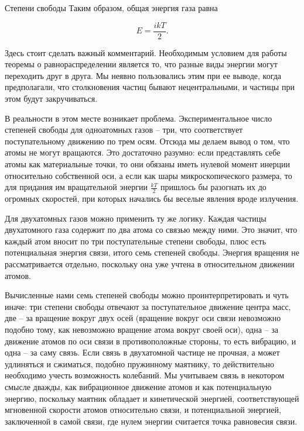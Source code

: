 \documentclass{article}
\begin{document}
\begin{section}{Степени свободы}
		Таким образом, общая энергия газа равна

		\begin{equation*}
			E = \frac{ikT}{2}.
		\end{equation*}

		Здесь стоит сделать важный комментарий. Необходимым условием для работы теоремы о равнораспределении является то, что разные виды энергии могут переходить друг в друга. Мы неявно пользовались этим при ее выводе, когда предполагали, что столкновения частиц бывают нецентральными, и частицы при этом будут закручиваться.

		В реальности в этом месте возникает проблема. Экспериментальное число степеней свободы для одноатомных газов -- три, что соответствует поступательному движению по трем осям. Отсюда мы делаем вывод о том, что атомы не могут вращаются. Это достаточно разумно: если представлять себе атомы как материальные точки, то они обязаны иметь нулевой момент инерции относительно собственной оси, а если как шары микроскопического размера, то для придания им вращательной энергии $\frac{kT}{2}$ пришлось бы разогнать их до огромных скоростей, при которых начались бы веселые явления вроде излучения.

		Для двухатомных газов можно применить ту же логику. Каждая частицы двухатомного газа содержит по два атома со связью между ними. Это значит, что каждый атом вносит по три поступательные степени свободы, плюс есть потенциальная энергия связи, итого семь степеней свободы. Энергия вращения не рассматривается отдельно, поскольку она уже учтена в относительном движении атомов.

		Вычисленные нами семь степеней свободы можно проинтерпретировать и чуть иначе: три степени свободы отвечают за поступательное движение центра масс, две -- за вращение вокруг двух осей (вращение вокруг оси связи невозможно подобно тому, как невозможно вращение атома вокруг своей оси), одна -- за движение атомов по оси связи в противоположные стороны, то есть вибрацию, и одна -- за саму связь.  Если связь в двухатомной частице не прочная, а может удлиняться и сжиматься, подобно пружинному маятнику, то действительно необходимо учесть возможность колебаний. Мы учитываем связь в некотором смысле дважды, как вибрационное движение атомов и как потенциальную энергию, поскольку маятник обладает и кинетической энергией, соответствующей мгновенной скорости атомов относительно связи, и потенциальной энергией, заключенной в самой связи, где нулем энергии считается точка равновесия связи.


\end{section}
\end{document}
